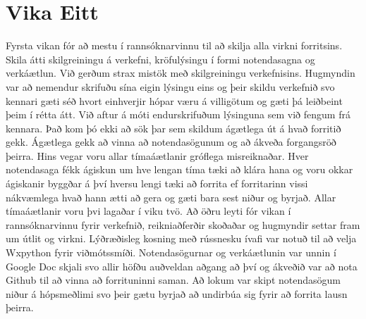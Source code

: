 \documentclass[a4paper,10pt]{article}
\begin{document}
\section{Vika Eitt}
Fyrsta vikan fór að mestu í rannsóknarvinnu til að skilja alla virkni forritsins.  Skila átti skilgreiningu á verkefni, kröfulýsingu í formi notendasagna og verkáætlun.  Við gerðum strax mistök með skilgreiningu verkefnisins.  Hugmyndin var að nemendur skrifuðu sína eigin lýsingu eins og þeir skildu verkefnið svo kennari gæti séð hvort einhverjir hópar væru á villigötum og gæti þá leiðbeint þeim í rétta átt.  Við aftur á móti endurskrifuðum lýsinguna sem við fengum frá kennara.  Það kom þó ekki að sök þar sem skildum ágætlega út á hvað forritið gekk.  Ágætlega gekk að vinna að notendasögunum og að ákveða forgangsröð þeirra.  Hins vegar voru allar tímaáætlanir gróflega misreiknaðar.  Hver notendasaga fékk ágiskun um hve lengan tíma tæki að klára hana og voru okkar ágiskanir byggðar á því hversu lengi tæki að forrita ef forritarinn vissi nákvæmlega hvað hann ætti að gera og gæti bara sest niður og byrjað.  Allar tímaáætlanir voru þvi lagaðar í viku tvö.  
Að öðru leyti fór vikan í rannsóknarvinnu fyrir verkefnið, reikniaðferðir skoðaðar og hugmyndir settar fram um útlit og virkni.  Lýðræðisleg kosning með rússnesku ívafi var notuð til að velja Wxpython fyrir viðmótssmíði.  Notendasögurnar og verkáætlunin var unnin í Google Doc skjali svo allir höfðu auðveldan aðgang að því og ákveðið var að nota Github til að vinna að forrituninni saman.  Að lokum var skipt notendasögum niður á hópsmeðlimi svo þeir gætu byrjað að undirbúa sig fyrir að forrita lausn þeirra.
\end{document}
